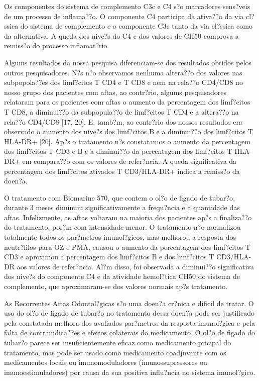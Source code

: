 \documentclass[12pt]{article}
\begin{document}
 Os componentes do sistema de complemento C3c e C4 s?o marcadores sens?veis de
um processo de inflama??o. O componente C4 participa da ativa??o da via
cl?ssica do sistema de complemento e o componente C3c tanto da via cl?ssica
como da alternativa. A queda dos nive?s do C4 e dos valores de CH50 comprova a
remiss?o do processo inflamat?rio.

 Algums resultados da nossa pesquisa diferenciam-se dos resultados obtidos
pelos outros pesquisadores. N?s n?o observamos nenhuma altera??o dos valores
nas subpopola??es dos limf?citos T CD4 e T CD8 e nem na rela??o CD4/CD8 no
nosso grupo dos pacientes com aftas, ao contr?rio, algums pesquisadores
relataram para os pacientes com aftas o aumento da percentagem dos limf?citos T
CD8, a diminui??o da subpopula??o de limf?citos T CD4 e a altera??o na rela??o
CD4/CD8 [17, 20]. E, tamb?m, ao contr?rio dos nossos resultados era observado o
aumento dos nive?s dos limf?citos B e a diminui??o dos limf?citos T HLA-DR+
[20]. Ap?s o tratamento n?s constatamos o aumento da percentagem dos limf?citos
T CD3 e B e a diminui??o da percentagem dos limf?citos T HLA-DR+ em compara??o
com os valores de refer?ncia. A queda significativa da percentagem dos
limf?citos ativados T CD3/HLA-DR+ indica a remiss?o da doen?a.

 O tratamento com Biomarine 570, que contem o ol?o de figado de tubar?o,
durante 3 meses diminuiu significativamente a frequ?ncia e a quantidade das
aftas. Infelizmente, as aftas voltaram na maioria dos pacientes ap?s a
finaliza??o do tratamento, por?m com intensidade menor. O tratamento n?o
normalizou totalmente todos os par?metros imunol?gicos, mas melhorou a resposta
dos neutr?filos para OZ e PMA,  causou o aumento da percentagem dos limf?citos
T CD3 e aproximou a percentagem dos limf?citos B e dos limf?citos T CD3/HLA-DR
aos valores de refer?ncia. Al?m disso, foi observada a diminui??o significativa
dos nive?s do componente C4 e da atividade hemol?tica CH50 do sistema de
complemento, que aproximaram-se dos valores normais ap?s tratamento.

 As Recorrentes Aftas Odontol?gicas s?o uma doen?a cr?nica e dificil de
tratar. O uso do ol?o de figado de tubar?o no tratamento dessa doen?a pode ser
justificado pela constatada melhora dos avaliados par?metros da resposta
imunol?gica e pela falta de contraindica??es e efeitos colaterais do
medicamento. O ol?o de figado do tubar?o parece ser insuficientemente eficaz
como medicamento pricipal do tratamento, mas pode ser usado como medicamento
coadjuvante com os medicamentos locais ou imunomoduladores (imunossupressores
ou imunoestimuladores) por causa da sua positiva influ?ncia no sistema
imunol?gico.
\end{document}
